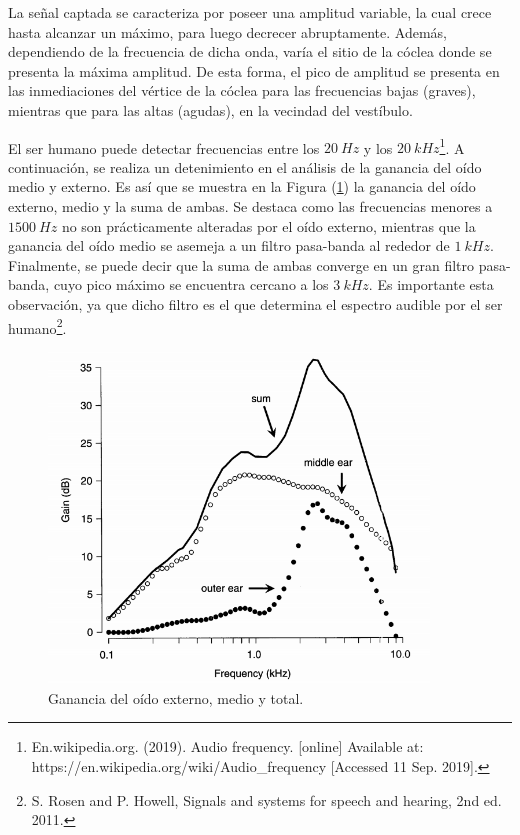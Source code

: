 \documentclass[a4paper]{article}
\begin{document}
La señal captada se caracteriza por poseer una amplitud variable, la cual crece hasta alcanzar un máximo, para luego decrecer abruptamente. Además, dependiendo de la frecuencia de dicha onda, varía el sitio de la cóclea donde se presenta la máxima amplitud. De esta forma, el pico de amplitud se presenta en las inmediaciones del vértice de la cóclea para las frecuencias bajas (graves), mientras que para las altas (agudas), en la vecindad del vestíbulo.

El ser humano puede detectar frecuencias entre los $20 \ Hz$ y los $20 \ kHz$\footnote{En.wikipedia.org. (2019). Audio frequency. [online] Available at: https://en.wikipedia.org/wiki/Audio\_frequency [Accessed 11 Sep. 2019].}. A continuación, se realiza un detenimiento en el análisis de la ganancia del oído medio y externo. Es así que se muestra en la Figura (\ref{fig:oidoganancia}) la ganancia del oído externo, medio y la suma de ambas. Se destaca como las frecuencias menores a $1500 \ Hz$ no son prácticamente alteradas por el oído externo, mientras que la ganancia del oído medio se asemeja a un filtro pasa-banda al rededor de $1 \ kHz$. Finalmente, se puede decir que la suma de ambas converge en un gran filtro pasa-banda, cuyo pico máximo se encuentra cercano a los $3 \ kHz$. Es importante esta observación, ya que dicho filtro es el que determina el espectro audible por el ser humano\footnote{S. Rosen and P. Howell, Signals and systems for speech and hearing, 2nd ed. 2011.}. 

\begin{figure}[H]
\centering
	\includegraphics[width=0.9\textwidth]{Imagenes/Ganancia-del-oido-externo-y-medio.png}
	\caption{Ganancia del oído externo, medio y total.}
	\label{fig:oidoganancia}
\end{figure}
\end{document}
